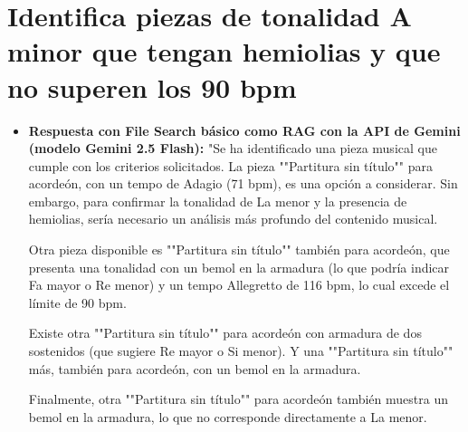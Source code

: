 \section{Identifica piezas de tonalidad A minor que tengan hemiolias y que no superen los 90 bpm}
\begin{itemize}
    \item \textbf{Respuesta con File Search básico como RAG con la API de Gemini (modelo Gemini 2.5 Flash):} "Se ha identificado una pieza musical que cumple con los criterios solicitados. La pieza ""Partitura sin título"" para acordeón, con un tempo de Adagio (71 bpm), es una opción a considerar. Sin embargo, para confirmar la tonalidad de La menor y la presencia de hemiolias, sería necesario un análisis más profundo del contenido musical.

Otra pieza disponible es ""Partitura sin título"" también para acordeón, que presenta una tonalidad con un bemol en la armadura (lo que podría indicar Fa mayor o Re menor) y un tempo Allegretto de 116 bpm, lo cual excede el límite de 90 bpm.

Existe otra ""Partitura sin título"" para acordeón con armadura de dos sostenidos (que sugiere Re mayor o Si menor). Y una ""Partitura sin título"" más, también para acordeón, con un bemol en la armadura.

Finalmente, otra ""Partitura sin título"" para acordeón también muestra un bemol en la armadura, lo que no corresponde directamente a La menor.


\end{itemize}
